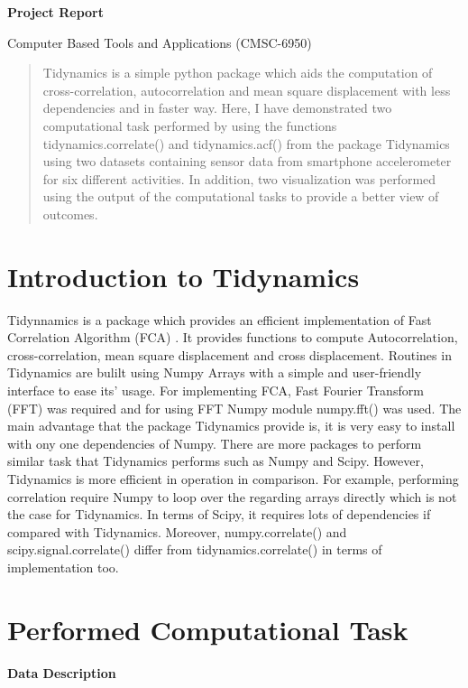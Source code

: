 \documentclass{article}
\begin{document}
   \begin{center}
       \vspace*{1cm}

       \textbf{Project Report}

       \vspace{0.5cm}
        Computer Based Tools and Applications (CMSC-6950)
   \end{center}
\begin{abstract}
Tidynamics is a simple python package which aids the computation of cross-correlation, autocorrelation and mean square displacement with less dependencies and in faster way. Here, I have demonstrated two computational task performed by using the functions tidynamics.correlate() and tidynamics.acf() from the package Tidynamics  using two datasets containing sensor data from smartphone accelerometer for six different activities. In addition, two visualization was performed using the output of the computational tasks to provide a better view of outcomes.
\end{abstract}

\section{Introduction to Tidynamics}

Tidynnamics is a package which provides an efficient implementation of Fast Correlation Algorithm (FCA) \cite{deBuy}. It provides functions to compute Autocorrelation, cross-correlation, mean square displacement and cross displacement. Routines in Tidynamics are bulilt using Numpy Arrays with a simple and user-friendly interface to ease its’ usage. For implementing FCA, Fast Fourier Transform (FFT) was required and for using FFT Numpy module numpy.fft() was used. 
The main advantage that the package Tidynamics provide is, it is very easy to install with ony one dependencies of Numpy. There are more packages to perform similar task that Tidynamics performs such as Numpy and Scipy. However, Tidynamics is more efficient in operation in comparison. For example, performing correlation require Numpy to loop over the regarding arrays directly which is not the case for Tidynamics. In terms of Scipy, it requires lots of dependencies if compared with Tidynamics. Moreover, numpy.correlate() and scipy.signal.correlate() differ from tidynamics.correlate() in terms of implementation too. 

\section{Performed Computational Task}
\textbf{Data Description}
\end{document}
